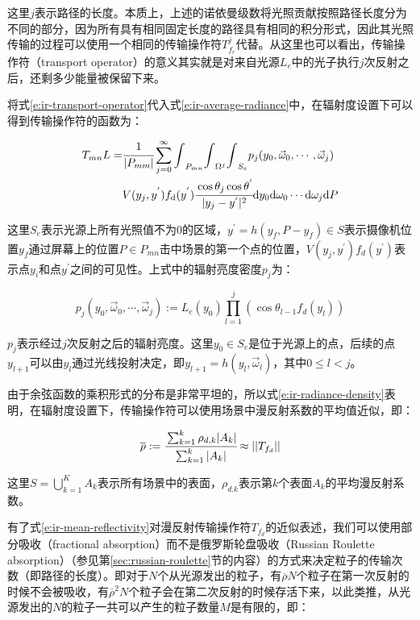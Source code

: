 \noindent 这里$j$表示路径的长度。本质上，上述的诺依曼级数将光照贡献按照路径长度分为不同的部分，因为所有具有相同固定长度的路径具有相同的积分形式，因此其光照传输的过程可以使用一个相同的传输操作符$T^{j}_{f_r}$代替。从这里也可以看出，传输操作符（transport operator）的意义其实就是对来自光源$L_e$中的光子执行$j$次反射之后，还剩多少能量被保留下来。

将式\ref{e:ir-transport-operator}代入式\ref{e:ir-average-radiance}中，在辐射度设置下可以得到传输操作符的函数为：

\begin{equation}
\begin{aligned}
	T_{mn}L=& \cfrac{1}{|P_{mm}|}\sum^{\infty}_{j=0}{\rm \int}_{P_{mn}}{\rm \int}_{\Omega^{j}}{\rm \int}_{S_e}p_j(y_0,\vec{\omega}_0,\cdots,\vec{\omega}_j)\\
	&V(y_j,y^{'})f_{\rm d}(y^{'}) \cfrac{\cos\theta_j\cos\theta^{'}}{|y_j-y^{'}|^{2}}{\rm d}y_0{\rm d}\omega_0\cdots {\rm d}\omega_j{\rm d}P
\end{aligned}
\end{equation}

\noindent 这里$S_e$表示光源上所有光照值不为0的区域，$y^{'}=h(y_f,P-y_f)\in S$表示摄像机位置$y_f$通过屏幕上的位置$P\in P_{mn}$击中场景的第一个点的位置，$V(y_j,y^{'})f_d(y^{'})$表示点$y_i$和点$y^{'}$之间的可见性。上式中的辐射亮度密度$p_j$为：

\begin{equation}\label{e:ir-radiance-density}
	p_j(y_0,\vec{\omega}_0,\cdots,\vec{\omega}_j):=L_e(y_0)\prod^{j}_{l=1}(\cos\theta_{l-1}f_d(y_l))
\end{equation}

\noindent $p_j$表示经过$j$次反射之后的辐射亮度。这里$y_0\in S_e$是位于光源上的点，后续的点$y_{l+1}$可以由$y_l$通过光线投射决定，即$y_{l+1}=h(y_l,\vec{\omega}_l)$，其中$0\leq l<j$。

由于余弦函数的乘积形式的分布是非常平坦的，所以式\ref{e:ir-radiance-density}表明，在辐射度设置下，传输操作符可以使用场景中漫反射系数的平均值近似，即：

\begin{equation}\label{e:ir-mean-reflectivity}
	\overline{\rho}:= \cfrac{\sum^{k}_{k=1}\rho_{d,k}|A_k|}{\sum^{k}_{k=1}|A_k|}\approx ||T_{f_d}||
\end{equation}

\noindent 这里$S=\bigcup^{K}_{k=1}A_k$表示所有场景中的表面，$\rho_{d.k}$表示第$k$个表面$A_k$的平均漫反射系数。

有了式\ref{e:ir-mean-reflectivity}对漫反射传输操作符$T_{f_d}$的近似表述，我们可以使用部分吸收（fractional absorption）而不是俄罗斯轮盘吸收（Russian Roulette absorption）（参见第\ref{sec:russian-roulette}节的内容）的方式来决定粒子的传输次数（即路径的长度）。即对于$N$个从光源发出的粒子，有$\overline{\rho}N$个粒子在第一次反射的时候不会被吸收，有$\overline{\rho}^{2}N$个粒子会在第二次反射的时候存活下来，以此类推，从光源发出的$N$的粒子一共可以产生的粒子数量$M$是有限的，即：

